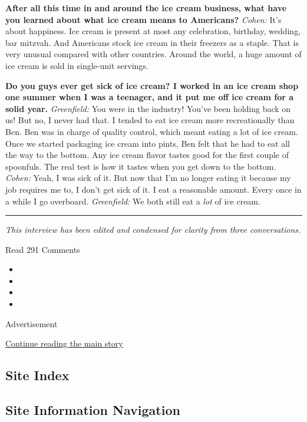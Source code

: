 \textbf{After all this time in and around the ice cream business, what
have you learned about what ice cream means to Americans?} \emph{Cohen:}
It's about happiness. Ice cream is present at most any celebration,
birthday, wedding, bar mitzvah. And Americans stock ice cream in their
freezers as a staple. That is very unusual compared with other
countries. Around the world, a huge amount of ice cream is sold in
single-unit servings.

\textbf{Do you guys ever get sick of ice cream? I worked in an ice cream
shop one summer when I was a teenager, and it put me off ice cream for a
solid year.} \emph{Greenfield:} You were in the industry! You've been
holding back on us! But no, I never had that. I tended to eat ice cream
more recreationally than Ben. Ben was in charge of quality control,
which meant eating a lot of ice cream. Once we started packaging ice
cream into pints, Ben felt that he had to eat all the way to the bottom.
Any ice cream flavor tastes good for the first couple of spoonfuls. The
real test is how it tastes when you get down to the bottom.
\emph{Cohen:} Yeah, I was sick of it. But now that I'm no longer eating
it because my job requires me to, I don't get sick of it. I eat a
reasonable amount. Every once in a while I go overboard.
\emph{Greenfield:} We both still eat a \emph{lot} of ice cream.

\begin{center}\rule{0.5\linewidth}{\linethickness}\end{center}

\emph{This interview has been edited and condensed for clarity from
three conversations.}

Read 291 Comments

\begin{itemize}
\item
\item
\item
\item
\end{itemize}

Advertisement

\protect\hyperlink{after-bottom}{Continue reading the main story}

\hypertarget{site-index}{%
\subsection{Site Index}\label{site-index}}

\hypertarget{site-information-navigation}{%
\subsection{Site Information
Navigation}\label{site-information-navigation}}

